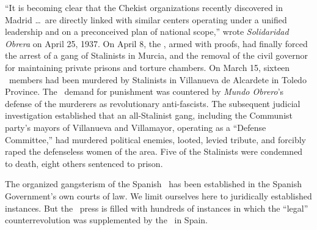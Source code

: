 ``It is becoming clear that the Chekist organizations recently discovered in Madrid \dots\ are directly linked with similar centers operating under a unified leadership and on a preconceived plan of national scope,''
wrote \emph{Solidaridad Obrera} on April 25, 1937.
On April 8, the \CNT\kn, armed with proofs, had finally forced the arrest of a gang of Stalinists in Murcia, and the removal of the civil governor for maintaining private prisons and torture chambers. On March 15, sixteen \CNT\ members had been murdered by Stalinists in Villanueva de Alcardete in Toledo Province. The \CNT\ demand for punishment was countered by \emph{Mundo Obrero}’s defense of the murderers as revolutionary anti-fascists. The subsequent judicial investigation established that an all-Stalinist gang, including the Communist party’s mayors of Villanueva and Villamayor, operating as a ``Defense Committee,'' had murdered political enemies, looted, levied tribute, and forcibly raped the defenseless women of the area. Five of the Stalinists were condemned to death, eight others sentenced to prison.

The organized gangsterism of the Spanish \GPU\ has been established in the Spanish Government’s own courts of law. We limit ourselves here to juridically established instances. But the \CNT\ press is filled with hundreds of instances in which the ``legal'' counterrevolution was supplemented by the \GPU\ in Spain.